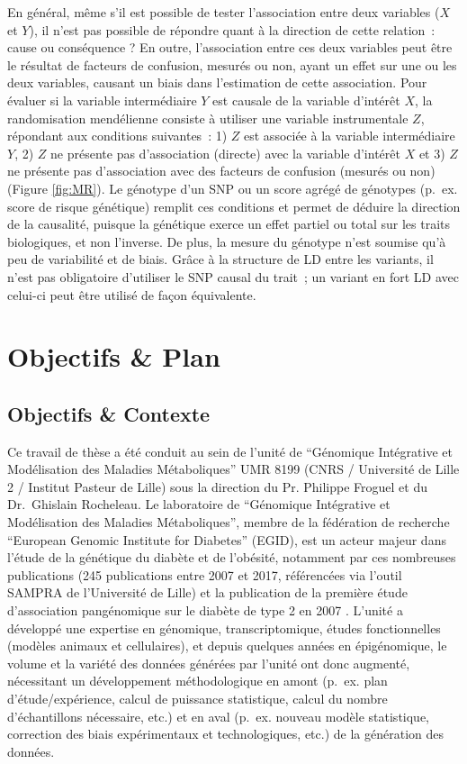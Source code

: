 \documentclass[11pt,a4paper,notrimn]{krantz}
\theoremstyle{definition}
\theoremstyle{definition}
\theoremstyle{remark}
\begin{document}
En général, même s'il est possible de tester l'association entre deux
variables (\(X\) et \(Y\)), il n'est pas possible de répondre quant à la
direction de cette relation~: cause ou conséquence ? En outre,
l'association entre ces deux variables peut être le résultat de facteurs
de confusion, mesurés ou non, ayant un effet sur une ou les deux
variables, causant un biais dans l'estimation de cette association. Pour
évaluer si la variable intermédiaire \(Y\) est causale de la variable
d'intérêt \(X\), la randomisation mendélienne consiste à utiliser une
variable instrumentale \(Z\), répondant aux conditions suivantes~: 1)
\(Z\) est associée à la variable intermédiaire \(Y\), 2) \(Z\) ne
présente pas d'association (directe) avec la variable d'intérêt \(X\) et
3) \(Z\) ne présente pas d'association avec des facteurs de confusion
(mesurés ou non) (Figure \ref{fig:MR}). Le génotype d'un SNP ou un score
agrégé de génotypes (p.~ex. score de risque génétique) remplit ces
conditions et permet de déduire la direction de la causalité, puisque la
génétique exerce un effet partiel ou total sur les traits biologiques,
et non l'inverse. De plus, la mesure du génotype n'est soumise qu'à peu
de variabilité et de biais. Grâce à la structure de LD entre les
variants, il n'est pas obligatoire d'utiliser le SNP causal du trait~;
un variant en fort LD avec celui-ci peut être utilisé de façon
équivalente.

\chapter*{Objectifs \& Plan}\label{objectifs-plan}


\section*{Objectifs \& Contexte}\label{objectifs-contexte}


Ce travail de thèse a été conduit au sein de l'unité de ``Génomique
Intégrative et Modélisation des Maladies Métaboliques'' UMR 8199 (CNRS /
Université de Lille 2 / Institut Pasteur de Lille) sous la direction du
Pr. Philippe Froguel et du Dr.~Ghislain Rocheleau. Le laboratoire de
``Génomique Intégrative et Modélisation des Maladies Métaboliques'',
membre de la fédération de recherche ``European Genomic Institute for
Diabetes'' (EGID), est un acteur majeur dans l'étude de la génétique du
diabète et de l'obésité, notamment par ces nombreuses publications (245
publications entre 2007 et 2017, référencées via l'outil SAMPRA de
l'Université de Lille) et la publication de la première étude
d'association pangénomique sur le diabète de type 2 en 2007
\citep{sladek_genome-wide_2007}. L'unité a développé une expertise en
génomique, transcriptomique, études fonctionnelles (modèles animaux et
cellulaires), et depuis quelques années en épigénomique, le volume et la
variété des données générées par l'unité ont donc augmenté, nécessitant
un développement méthodologique en amont (p.~ex. plan
d'étude/expérience, calcul de puissance statistique, calcul du nombre
d'échantillons nécessaire, etc.) et en aval (p.~ex. nouveau modèle
statistique, correction des biais expérimentaux et technologiques, etc.)
de la génération des données.
\end{document}
